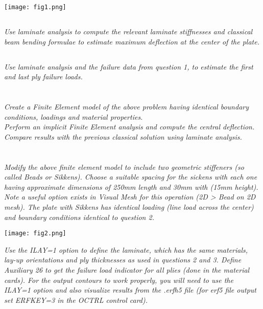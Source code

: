 \documentclass[a4paper,twosided,12pt,DIV12]{scrartcl}
\begin{document}
\begin{center}
  \texttt{[image: fig1.png]}
\end{center}

\subsection{}

\textit{Use laminate analysis to compute the relevant laminate stiffnesses and classical
beam bending formulae to estimate maximum deflection at the center of the
plate.}

\subsection{}

\textit{Use laminate analysis and the failure data from question 1, to estimate the
first and last ply failure loads.}

\section{}

\textit{Create a Finite Element model of the above problem having identical
boundary conditions, loadings and material properties.
\\Perform an implicit Finite Element analysis and compute the central
deflection. Compare results with the previous classical solution using laminate
analysis.}

\section{}

\textit{Modify the above finite element model to include two geometric stiffeners (so
called Beads or Sikkens). Choose a suitable spacing for the sickens with each
one having approximate dimensions of 250mm length and 30mm with (15mm height).
Note a useful option exists in Visual Mesh for this operation (2D > Bead on 2D mesh).
The plate with Sikkens has identical loading (line load across the center) and
boundary conditions identical to question 2.}

\begin{center}
  \texttt{[image: fig2.png]}
\end{center}

\textit{Use the ILAY=1 option to define the laminate, which has the same materials,
lay-up orientations and ply thicknesses as used in questions 2 and 3. Define
Auxiliary 26 to get the failure load indicator for all plies (done in the
material cards). For the output contours to work properly, you will need to use
the ILAY=1 option and also visualize results from the .erfh5 file (for erf5 file
output set ERFKEY=3 in the OCTRL control card).}
\end{document}
